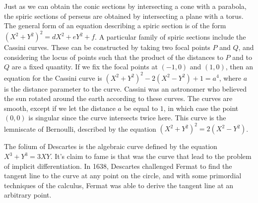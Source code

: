 \begin{example}
    Just as we can obtain the conic sections by intersecting a cone with a parabola, the spiric sections of perseus are obtained by intersecting a plane with a torus. The general form of an equation describing a spiric section is of the form $(X^2 + Y^2)^2 = dX^2 + eY^2 + f$. A particular family of spiric sections include the Cassini curves. These can be constructed by taking two focal points $P$ and $Q$, and considering the locus of points such that the product of the distances to $P$ and to $Q$ are a fixed quantity. If we fix the focal points at $(-1,0)$ and $(1,0)$, then an equation for the Cassini curve is $(X^2 + Y^2)^2 - 2(X^2 - Y^2) + 1 = a^4$, where $a$ is the distance parameter to the curve. Cassini was an astronomer who believed the sun rotated around the earth according to these curves. The curves are smooth, except if we let the distance $a$ be equal to $1$, in which case the point $(0,0)$ is singular since the curve intersects twice here. This curve is the lemniscate of Bernoulli, described by the equation $(X^2 + Y^2)^2 = 2(X^2 - Y^2)$.
\end{example}

\begin{example}
    The folium of Descartes is the algebraic curve defined by the equation $X^3 + Y^3 = 3XY$. It's claim to fame is that was the curve that lead to the problem of implicit differentiation. In 1638, Descartes challenged Fermat to find the tangent line to the curve at any point on the circle, and with some primordial techniques of the calculus, Fermat was able to derive the tangent line at an arbitrary point.
\end{example}

